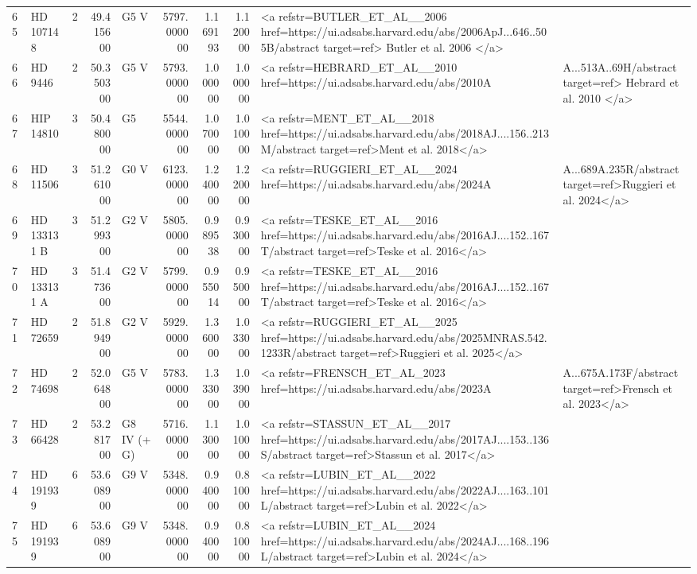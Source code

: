 \begin{tabular}{llrrlrrrl}
65 & HD 107148 & 2 & 49.415600 & G5 V & 5797.000000 & 1.169193 & 1.120000 & <a refstr=BUTLER_ET_AL__2006 href=https://ui.adsabs.harvard.edu/abs/2006ApJ...646..505B/abstract target=ref> Butler et al. 2006 </a> \\
66 & HD 9446 & 2 & 50.350300 & G5 V & 5793.000000 & 1.000000 & 1.000000 & <a refstr=HEBRARD_ET_AL__2010 href=https://ui.adsabs.harvard.edu/abs/2010A&A...513A..69H/abstract target=ref> Hebrard et al. 2010 </a> \\
67 & HIP 14810 & 3 & 50.480000 & G5 & 5544.000000 & 1.070000 & 1.010000 & <a refstr=MENT_ET_AL__2018 href=https://ui.adsabs.harvard.edu/abs/2018AJ....156..213M/abstract target=ref>Ment et al. 2018</a> \\
68 & HD 11506 & 3 & 51.261000 & G0 V & 6123.000000 & 1.240000 & 1.220000 & <a refstr=RUGGIERI_ET_AL__2024 href=https://ui.adsabs.harvard.edu/abs/2024A&A...689A.235R/abstract target=ref>Ruggieri et al. 2024</a> \\
69 & HD 133131 B & 3 & 51.299300 & G2 V & 5805.000000 & 0.989538 & 0.930000 & <a refstr=TESKE_ET_AL__2016 href=https://ui.adsabs.harvard.edu/abs/2016AJ....152..167T/abstract target=ref>Teske et al. 2016</a> \\
70 & HD 133131 A & 3 & 51.473600 & G2 V & 5799.000000 & 0.955014 & 0.950000 & <a refstr=TESKE_ET_AL__2016 href=https://ui.adsabs.harvard.edu/abs/2016AJ....152..167T/abstract target=ref>Teske et al. 2016</a> \\
71 & HD 72659 & 2 & 51.894900 & G2 V & 5929.000000 & 1.360000 & 1.033000 & <a refstr=RUGGIERI_ET_AL__2025 href=https://ui.adsabs.harvard.edu/abs/2025MNRAS.542.1233R/abstract target=ref>Ruggieri et al. 2025</a> \\
72 & HD 74698 & 2 & 52.064800 & G5 V & 5783.000000 & 1.333000 & 1.039000 & <a refstr=FRENSCH_ET_AL_2023 href=https://ui.adsabs.harvard.edu/abs/2023A&A...675A.173F/abstract target=ref>Frensch et al. 2023</a> \\
73 & HD 66428 & 2 & 53.281700 & G8 IV (+ G) & 5716.000000 & 1.130000 & 1.010000 & <a refstr=STASSUN_ET_AL__2017 href=https://ui.adsabs.harvard.edu/abs/2017AJ....153..136S/abstract target=ref>Stassun et al. 2017</a> \\
74 & HD 191939 & 6 & 53.608900 & G9 V & 5348.000000 & 0.940000 & 0.810000 & <a refstr=LUBIN_ET_AL__2022 href=https://ui.adsabs.harvard.edu/abs/2022AJ....163..101L/abstract target=ref>Lubin et al. 2022</a> \\
75 & HD 191939 & 6 & 53.608900 & G9 V & 5348.000000 & 0.940000 & 0.810000 & <a refstr=LUBIN_ET_AL__2024 href=https://ui.adsabs.harvard.edu/abs/2024AJ....168..196L/abstract target=ref>Lubin et al. 2024</a> \\

\end{tabular}
